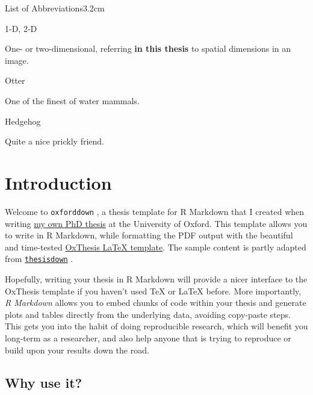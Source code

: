 \documentclass[a4paper, nobind]{templates/ociamthesis}
\begin{document}
\begin{romanpages}
\begin{mclistof}{List of Abbreviations}{3.2cm}
\item[1-D, 2-D]

One- or two-dimensional, referring \textbf{in this thesis} to spatial dimensions in an image.

\item[Otter]

One of the finest of water mammals.

\item[Hedgehog]

Quite a nice prickly friend.

\end{mclistof} 


\end{romanpages}

\flushbottom

\hypertarget{introduction}{%
\chapter*{Introduction}\label{introduction}}

\adjustmtc
{}

Welcome to \texttt{oxforddown} \autocite{lyngsOxforddown2019}, a thesis template for R Markdown that I created when writing \href{https://ulyngs.github.io/phd-thesis/}{my own PhD thesis} at the University of Oxford.
This template allows you to write in R Markdown, while formatting the PDF output with the beautiful and time-tested \href{https://github.com/mcmanigle/OxThesis}{OxThesis LaTeX template}.
The sample content is partly adapted from \href{https://github.com/ismayc/thesisdown}{\texttt{thesisdown}} .

Hopefully, writing your thesis in R Markdown will provide a nicer interface to the OxThesis template if you haven't used TeX or LaTeX before.
More importantly, \emph{R Markdown} allows you to embed chunks of code within your thesis and generate plots and tables directly from the underlying data, avoiding copy-paste steps.
This gets you into the habit of doing reproducible research, which will benefit you long-term as a researcher, and also help anyone that is trying to reproduce or build upon your results down the road.

\hypertarget{why-use-it}{%
\section*{Why use it?}\label{why-use-it}}
\end{document}
